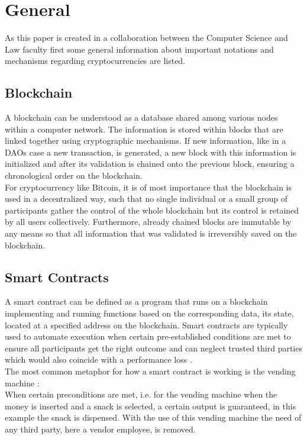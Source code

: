 \documentclass[a4paper,12pt]{report}
\begin{document}
	\section{General}
	\startsection
	    As this paper is created in a collaboration between the Computer Science and Law faculty first some general information about important notations and mechanisms regarding cryptocurrencies are listed.
	    \subsection[Blockchain]{Blockchain \parencite{AH22}}
	    \startsubsection
	        A blockchain can be understood as a database shared among various nodes within a computer network. The information is stored within blocks that are linked together using cryptographic mechanisms. If new information, like in a DAOs case a new transaction, is generated, a new block with this information is initialized and after its validation is chained onto the previous block, ensuring a chronological order on the blockchain. \\
	        For cryptocurrency like Bitcoin, it is of most importance that the blockchain is used in a decentralized way, such that no single individual or a small group of participants gather the control of the whole blockchain but its control is retained by all users collectively. Furthermore, already chained blocks are immutable by any means so that all information that was validated is irreversibly saved on the blockchain.
	    \closesection
	    \subsection{Smart Contracts} \label{Smart Contracts}
	    \startsubsection
	        A smart contract can be defined as a program that runs on a blockchain implementing and running functions based on the corresponding data, its state, located at a specified address on the blockchain. Smart contracts are typically used to automate execution when certain pre-established conditions are met to ensure all participants get the right outcome and can neglect trusted third parties which would also coincide with a performance loss \parencite{SmartContractsDef}. \\
	        The most common metaphor for how a smart contract is working is the vending machine \parencite{SmartContractsVendingMachine}: \\
	        \beginbigcite
	            When certain preconditions are met, i.e. for the vending machine when the money is inserted and a snack is selected, a certain output is guaranteed, in this example the snack is dispensed. With the use of this vending machine the need of any third party, here a vendor employee, is removed.
	        \closebigcite
	    \closesection
\end{document}
